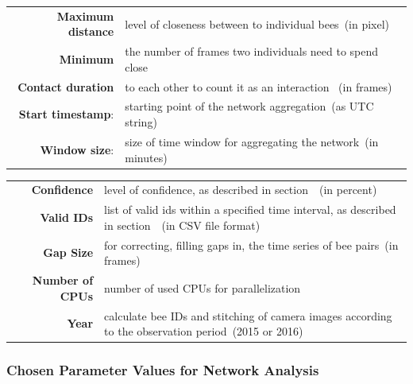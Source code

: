 \begin{table}[htbp]
\centering
\begin{tabularx}{\textwidth}{@{} r Y @{}}
\textbf{Maximum distance} & level of closeness between to individual bees~(in pixel) \vspace{3mm} \\
\textbf{Minimum} & the number of frames two individuals need to spend close\\
\textbf{Contact duration} &  to each other to count it as an interaction ~(in frames) \vspace{3mm} \\
\textbf{Start timestamp}: & starting point of the network aggregation~(as UTC string) \vspace{3mm} \\
\textbf{Window size}: & size of time window for aggregating the network~(in minutes) \\
\end{tabularx}
\end{table}

\begin{table}[htbp]
\centering
\begin{tabularx}{\textwidth}{@{} r Y @{}}
\textbf{Confidence} & level of confidence, as described in section~~(in percent) \vspace{3mm}\\
\textbf{Valid IDs} & list of valid ids within a specified time interval, as described in section~~(in CSV file format) \vspace{3mm}\\
\textbf{Gap Size} & for correcting, filling gaps in, the time series of bee pairs~(in frames) \vspace{3mm}\\
\textbf{Number of CPUs} & number of used CPUs for parallelization \vspace{3mm}\\
\textbf{Year} & calculate bee IDs and stitching of camera images according to the observation period~(2015 or 2016)\\
\end{tabularx}
\end{table}

\subsubsection{Chosen Parameter Values for Network Analysis}


